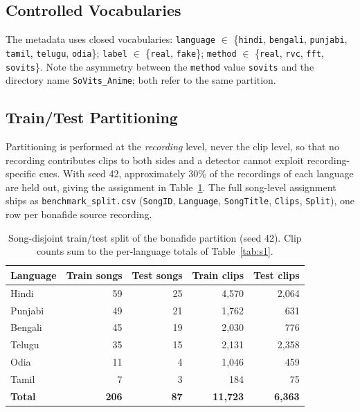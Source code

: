 \documentclass[conference]{IEEEtran}
\begin{document}
\subsection{Controlled Vocabularies}
The metadata uses closed vocabularies: \texttt{language} $\in$ \{\texttt{hindi},
\texttt{bengali}, \texttt{punjabi}, \texttt{tamil}, \texttt{telugu}, \texttt{odia}\};
\texttt{label} $\in$ \{\texttt{real}, \texttt{fake}\}; \texttt{method} $\in$
\{\texttt{real}, \texttt{rvc}, \texttt{fft}, \texttt{sovits}\}. Note the asymmetry
between the \texttt{method} value \texttt{sovits} and the directory name
\texttt{SoVits\_Anime}; both refer to the same partition.

\subsection{Train/Test Partitioning}
\label{sec:split}
Partitioning is performed at the \emph{recording} level, never the clip level, so that no
recording contributes clips to both sides and a detector cannot exploit
recording-specific cues. With seed 42, approximately 30\% of the recordings of each
language are held out, giving the assignment in Table~\ref{tab:s5}. The full song-level
assignment ships as \texttt{benchmark\_split.csv} (\texttt{SongID}, \texttt{Language},
\texttt{SongTitle}, \texttt{Clips}, \texttt{Split}), one row per bonafide source
recording.

\begin{table}[t]
\centering
\caption{Song-disjoint train/test split of the bonafide partition (seed 42). Clip counts
sum to the per-language totals of Table~\ref{tab:s1}.}
\label{tab:s5}
\footnotesize
\setlength{\tabcolsep}{4pt}
\begin{tabular}{lrrrr}
\toprule
\textbf{Language} & \textbf{Train songs} & \textbf{Test songs} & \textbf{Train clips} & \textbf{Test clips} \\
\midrule
Hindi   & 59 & 25 & 4{,}570 & 2{,}064 \\
Punjabi & 49 & 21 & 1{,}762 &   631 \\
Bengali & 45 & 19 & 2{,}030 &   776 \\
Telugu  & 35 & 15 & 2{,}131 & 2{,}358 \\
Odia    & 11 &  4 & 1{,}046 &   459 \\
Tamil   &  7 &  3 &   184 &    75 \\
\midrule
\textbf{Total} & \textbf{206} & \textbf{87} & \textbf{11{,}723} & \textbf{6{,}363} \\
\bottomrule
\end{tabular}
\end{table}
\end{document}
